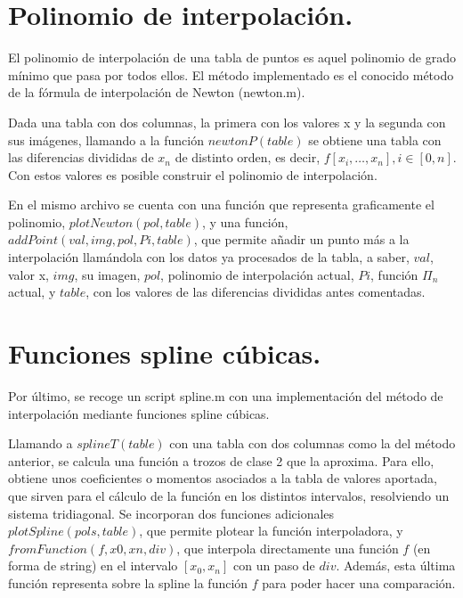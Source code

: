 \documentclass[spanish, a4paper, 12pt] {article}
\begin{document}
\section*{Polinomio de interpolación.}
El polinomio de interpolación de una tabla de puntos es aquel polinomio de grado mínimo que pasa por todos ellos. El método implementado es el conocido método de la fórmula de interpolación de Newton (newton.m).\\ \par
Dada una tabla con dos columnas, la primera con los valores x y la segunda con sus imágenes, llamando a la función $newtonP(table)$ se obtiene una tabla con las diferencias divididas de $x_n$ de distinto orden, es decir, $f[x_i, \ldots, x_n], i\in[0, n]$. Con estos valores es posible construir el polinomio de interpolación.\\ \par
En el mismo archivo se cuenta con una función que representa graficamente el polinomio, $plotNewton(pol, table)$, y una función, $addPoint(val, img, pol, Pi, table)$, que permite añadir un punto más a la interpolación llamándola con los datos ya procesados de la tabla, a saber, $val$, valor x, $img$, su imagen, $pol$, polinomio de interpolación actual, $Pi$, función $\Pi_n$ actual, y $table$, con los valores de las diferencias divididas antes comentadas.
\section*{Funciones spline cúbicas.}
Por último, se recoge un script spline.m con una implementación del método de interpolación mediante funciones spline cúbicas.\\ \par
Llamando a $splineT(table)$ con una tabla con dos columnas como la del método anterior, se calcula una función a trozos de clase 2 que la aproxima. Para ello, obtiene unos coeficientes o momentos asociados a la tabla de valores aportada, que sirven para el cálculo de la función en los distintos intervalos, resolviendo un sistema tridiagonal. Se incorporan dos funciones adicionales $plotSpline(pols, table)$, que permite plotear la función interpoladora, y $fromFunction(f, x0, xn, div)$, que interpola directamente una función $f$ (en forma de string) en el intervalo $[x_0, x_n]$ con un paso de $div$. Además, esta última función representa sobre la spline la función $f$ para poder hacer una comparación.
\end{document}
